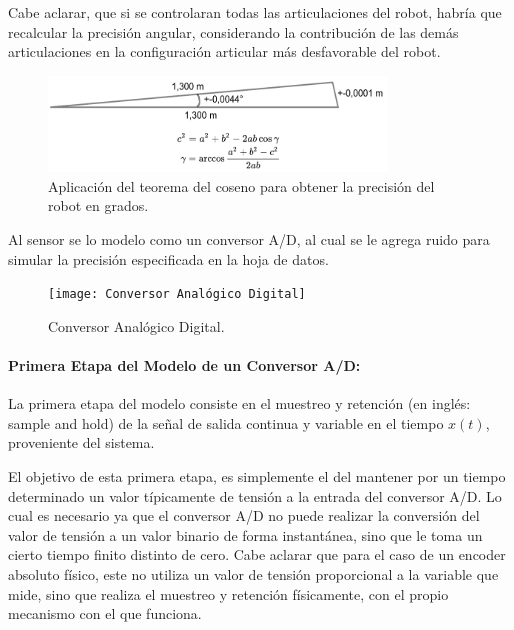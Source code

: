 \documentclass{article}
\begin{document}
\begin{sloppypar}
Cabe aclarar, que si se controlaran todas las articulaciones del robot, habría que recalcular la precisión angular, considerando la contribución de las demás articulaciones en la configuración articular más desfavorable del robot.

\begin{figure}[H]
    \centering
    \includegraphics[width=0.8\textwidth]{Aplicación del teorema del coseno para obtener la precisión del robot en grados}
    \caption{Aplicación del teorema del coseno para obtener la precisión del robot en grados.}
    \label{fig:Aplicación del teorema del coseno para obtener la precisión del robot en grados}
\end{figure}

Al sensor se lo modelo como un conversor A/D, al cual se le agrega ruido para simular la precisión especificada en la hoja de datos.

\begin{figure}[H]
    \centering
    \texttt{[image: Conversor Analógico Digital]}
    \caption{Conversor Analógico Digital.}
    \label{fig:Conversor Analógico Digital}
\end{figure}

\paragraph{Primera Etapa del Modelo de un Conversor A/D:}
\label{sec:Primera Etapa del Modelo de un Conversor A/D:}
\hfill

\hfill

La primera etapa del modelo consiste en el muestreo y retención (en inglés: sample and hold) de la señal de salida continua y variable en el tiempo $x(t)$, proveniente del sistema.

El objetivo de esta primera etapa, es simplemente el del mantener por un tiempo determinado un valor típicamente de tensión a la entrada del conversor A/D. Lo cual es necesario ya que el conversor A/D no puede realizar la conversión del valor de tensión a un valor binario de forma instantánea, sino que le toma un cierto tiempo finito distinto de cero. Cabe aclarar que para el caso de un encoder absoluto físico, este no utiliza un valor de tensión proporcional a la variable que mide, sino que realiza el muestreo y retención físicamente, con el propio mecanismo con el que funciona.


\end{sloppypar}
\end{document}

